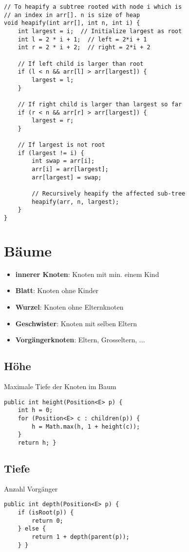 \begin{multicols*}{4}
\begin{lstlisting}
// To heapify a subtree rooted with node i which is 
// an index in arr[]. n is size of heap 
void heapify(int arr[], int n, int i) { 
	int largest = i;  // Initialize largest as root 
	int l = 2 * i + 1;  // left = 2*i + 1 
	int r = 2 * i + 2;  // right = 2*i + 2 
	
	// If left child is larger than root 
	if (l < n && arr[l] > arr[largest]) {
		largest = l; 
	}
	
	// If right child is larger than largest so far 
	if (r < n && arr[r] > arr[largest]) {
		largest = r; 
	}
	
	// If largest is not root 
	if (largest != i) { 
		int swap = arr[i]; 
		arr[i] = arr[largest]; 
		arr[largest] = swap; 
		
		// Recursively heapify the affected sub-tree 
		heapify(arr, n, largest); 
	} 
} 
			\end{lstlisting}

		
		
\section{Bäume}
	\begin{itemize}
		\item \textbf{innerer Knoten}: Knoten mit min. einem Kind
		\item \textbf{Blatt}: Knoten ohne Kinder
		\item \textbf{Wurzel}: Knoten ohne Elternknoten
		\item \textbf{Geschwister}: Knoten mit selben Eltern
		\item \textbf{Vorgängerknoten}: Eltern, Grosseltern, ...
	\end{itemize}

	\subsection{Höhe}
	Maximale Tiefe der Knoten im Baum
		\begin{lstlisting}
public int height(Position<E> p) {
	int h = 0;
	for (Position<E> c : children(p)) {
		h = Math.max(h, 1 + height(c));
	}
	return h; }
		\end{lstlisting}
	
	\subsection{Tiefe}
	Anzahl Vorgänger
		\begin{lstlisting}
public int depth(Position<E> p) {
	if (isRoot(p)) {
		return 0;
	} else {
		return 1 + depth(parent(p));
	} }
		\end{lstlisting}

\end{multicols*}
